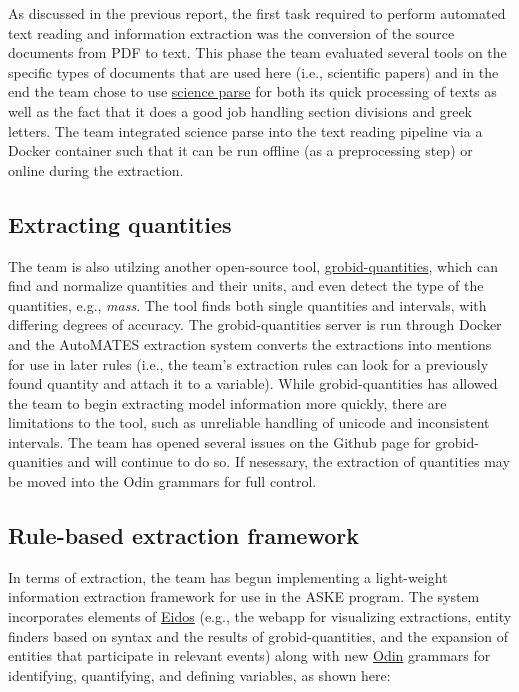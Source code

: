 \documentclass[article, 12pt, oneside]{memoir}
\begin{document}
As discussed in the previous report, the first task required to perform
automated text reading and information extraction was the conversion of
the source documents from PDF to text. This phase the team evaluated
several tools on the specific types of documents that are used here
(i.e., scientific papers) and in the end the team chose to use
\href{https://github.com/allenai/science-parse}{science parse} for both
its quick processing of texts as well as the fact that it does a good
job handling section divisions and greek letters. The team integrated
science parse into the text reading pipeline via a Docker container such
that it can be run offline (as a preprocessing step) or online during
the extraction.

\hypertarget{extracting-quantities}{%
\subsection{Extracting quantities}\label{extracting-quantities}}

The team is also utilzing another open-source tool,
\href{https://github.com/kermitt2/grobid-quantities}{grobid-quantities},
which can find and normalize quantities and their units, and even detect
the type of the quantities, e.g., \emph{mass}. The tool finds both
single quantities and intervals, with differing degrees of accuracy. The
grobid-quantities server is run through Docker and the AutoMATES
extraction system converts the extractions into mentions for use in
later rules (i.e., the team's extraction rules can look for a previously
found quantity and attach it to a variable). While grobid-quantities has
allowed the team to begin extracting model information more quickly,
there are limitations to the tool, such as unreliable handling of
unicode and inconsistent intervals. The team has opened several issues
on the Github page for grobid-quanities and will continue to do so. If
nesessary, the extraction of quantities may be moved into the Odin
grammars for full control.

\hypertarget{rule-based-extraction-framework}{%
\subsection{Rule-based extraction
framework}\label{rule-based-extraction-framework}}

In terms of extraction, the team has begun implementing a light-weight
information extraction framework for use in the ASKE program. The system
incorporates elements of \href{https://github.com/clulab/eidos}{Eidos}
(e.g., the webapp for visualizing extractions, entity finders based on
syntax and the results of grobid-quantities, and the expansion of
entities that participate in relevant events) along with new
\href{http://clulab.cs.arizona.edu/papers/lrec2016-odin.pdf}{Odin}
grammars for identifying, quantifying, and defining variables, as shown
here:
\end{document}
